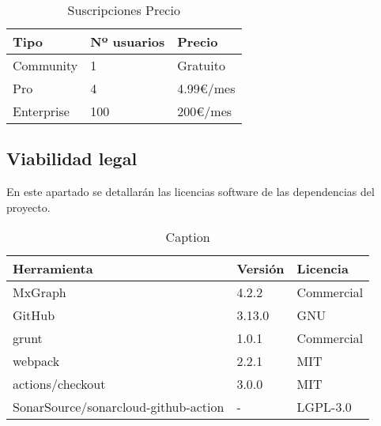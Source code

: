 \begin{table}[H]
    \centering
    \begin{tabular}{@{}lll@{}}\toprule
        \textbf{Tipo} & \textbf{Nº usuarios} & \textbf{Precio}\\ \midrule
        Community & 1 & Gratuito \\
        Pro & 4 & 4.99€/mes \\
        Enterprise & 100 & 200€/mes \\ \bottomrule
    \end{tabular}
    \caption{Suscripciones Precio}
    \label{ve:susc}
\end{table}

\subsection{Viabilidad legal}
En este apartado se detallarán las licencias software de las dependencias del proyecto.

\begin{table}[H]
    \centering
    \begin{tabular}{@{}lll@{}}\toprule
        \textbf{Herramienta} & \textbf{Versión} & \textbf{Licencia}\\ \midrule
        MxGraph & 4.2.2 & Commercial \\
        GitHub & 3.13.0 & GNU \\
        grunt & 1.0.1 & Commercial \\
        webpack & 2.2.1 & MIT \\
        actions/checkout & 3.0.0 & MIT \\
        SonarSource/sonarcloud-github-action & - & LGPL-3.0\\ \bottomrule
    \end{tabular}
    \caption{Caption}
    \label{tab:my_label}
\end{table}